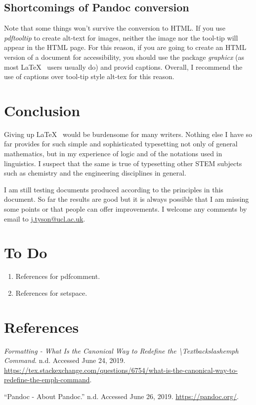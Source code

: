 \documentclass[]{article}
\begin{document}
\subsection{Shortcomings of Pandoc conversion}

Note that some things won't survive the conversion to HTML.  If you use
\emph{pdftooltip} to create alt-text for images, neither the image nor the tool-tip will appear in the 
HTML page.  For this reason, if you are going to create an HTML version of a document for accessibility, you 
should use the package \emph{graphicx} (as most \LaTeX~ users usually do) and provid captions.  Overall, 
I recommend the use of captions over tool-tip style alt-tex for this reason.

\hypertarget{conclusion}{%
\section{Conclusion}\label{conclusion}}

Giving up \LaTeX~ would be burdensome for many writers. Nothing else I
have so far provides for such simple and sophisticated typesetting not
only of general mathematics, but in my experience of logic and of the
notations used in linguistics. I suspect that the same is true of
typesetting other STEM subjects such as chemistry and the engineering
disciplines in general.

I am still testing documents produced according to the principles in
this document. So far the results are good but it is always possible
that I am missing some points or that people can offer improvements. I
welcome any comments by email to
\href{my\%20ucl\%20email\%20address}{j.tyson@ucl.ac.uk}.

\hypertarget{to-do}{%
\section{To Do}\label{to-do}}

\begin{enumerate}
\def\labelenumi{\arabic{enumi}.}
\item
  References for pdfcomment.
\item
  References for setspace.
\end{enumerate}
\hypertarget{references}{%
\section*{References}\label{references}}

\hypertarget{refs}{}
\leavevmode\hypertarget{ref-defineemph}{}%
\emph{Formatting - What Is the Canonical Way to Redefine the
\textbackslash{}Textbackslashemph Command}. n.d. Accessed June 24, 2019.
\url{https://tex.stackexchange.com/questions/6754/what-is-the-canonical-way-to-redefine-the-emph-command}.

\leavevmode\hypertarget{ref-pandoc}{}%
``Pandoc - About Pandoc.'' n.d. Accessed June 26, 2019.
\url{https://pandoc.org/}.
\end{document}
